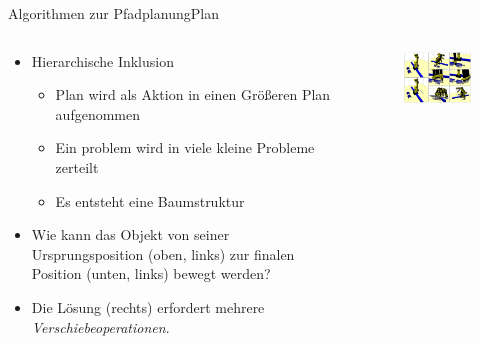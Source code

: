 \documentclass[t,aspectratio=169,dvipsnames]{beamer}
\begin{document}
\begin{frame}{Algorithmen zur Pfadplanung}{Plan}
\begin{columns}
	\begin{column}[T]{0.5\textwidth}
		\begin{itemize}[<+->]
			\item Hierarchische Inklusion
			\begin{itemize}
				\item Plan wird als Aktion in einen Größeren Plan aufgenommen
				\item Ein problem wird in viele kleine Probleme zerteilt
				\item Es entsteht eine Baumstruktur
			\end{itemize}
			\item Wie kann das Objekt von seiner Ursprungsposition (oben, links) zur finalen Position (unten, links) bewegt werden?
			\item Die Lösung (rechts) erfordert mehrere \textit{Verschiebeoperationen}.
			 
			
		\end{itemize}
	\end{column}
	\begin{column}[T]{0.5\textwidth}
		\begin{figure}
			\includegraphics[width=6.5cm]{images/hierarchical.png}
			\caption{} 
		\end{figure}
	\end{column}
\end{columns}
\end{frame}
\end{document}
